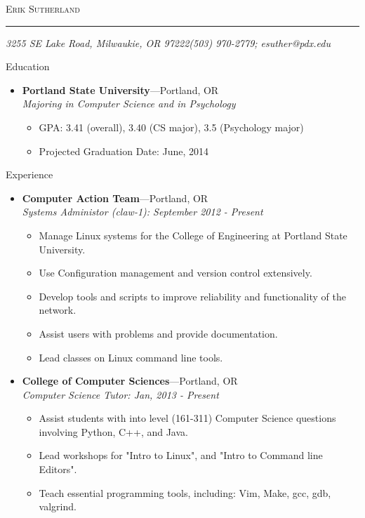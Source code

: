 \documentclass[11pt,oneside]{article}
\makeatletter
\newcommand{\name}{Erik Sutherland}
\newcommand{\addr}{3255 SE Lake Road, Milwaukie, OR 97222}
\newcommand{\phone}{(503) 970-2779}
\newcommand{\email}{esuther@pdx.edu}
\newcommand{\bigname}[1]{
	\begin{center}\fontfamily{phv}\selectfont\Huge\scshape#1\end{center}
}
\newenvironment{ressection}[1]{
	\vspace{4pt}
	{\fontfamily{phv}\selectfont\Large#1}
	\begin{itemize}
	\vspace{3pt}
}{
	\end{itemize}
}
\newcommand{\ressubitem}[1]{
	\vspace{-1pt}
	\item \begin{flushleft} #1 \end{flushleft}
}
\newcommand{\resbigitem}[3]{
	\vspace{-5pt}
	\item
	\textbf{#1}---#2 \\
	\textit{#3}
}
\newenvironment{ressubsec}[3]{
	\resbigitem{#1}{#2}{#3}
	\vspace{-2pt}
	\begin{itemize}
}{
	\end{itemize}
}
\makeatother
\begin{document}
 \selectfont

\bigname{\name}

\vspace{-8pt} \rule{\textwidth}{1pt}

\vspace{-1pt} {\small\itshape \addr \hfill \phone; \email}

\vspace{8 pt}




\begin{ressection}{Education}

    \begin{ressubsec}{Portland State University}{Portland, OR}{Majoring in Computer Science and in Psychology}
		\ressubitem{GPA: 3.41 (overall), 3.40 (CS major), 3.5 (Psychology major)}
		\ressubitem{Projected Graduation Date: June, 2014}
	\end{ressubsec}

\end{ressection}


\begin{ressection}{Experience}

    \begin{ressubsec}{Computer Action Team}{Portland, OR}{Systems Administor (claw-1): September 2012 - Present}
		\ressubitem{Manage Linux systems for the College of Engineering at Portland State University.}
		\ressubitem{Use Configuration management and version control extensively.}
		\ressubitem{Develop tools and scripts to improve reliability and functionality of the network.}
		\ressubitem{Assist users with problems and provide documentation.}
        \ressubitem{Lead classes on Linux command line tools.}
	\end{ressubsec}

	\begin{ressubsec}{College of Computer Sciences}{Portland, OR}{Computer Science Tutor: Jan, 2013 - Present}
        \ressubitem{Assist students with into level (161-311) Computer Science questions involving Python, C++, and Java.}
        \ressubitem{Lead workshops for "Intro to Linux", and "Intro to Command line Editors".}
        \ressubitem{Teach essential programming tools, including: Vim, Make, gcc, gdb, valgrind.}
	\end{ressubsec}

\end{ressection}
\end{document}
